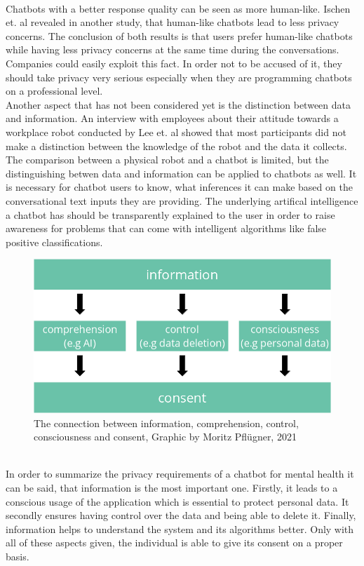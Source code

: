 \documentclass[sigconf, nonacm]{acmart}
\begin{document}
\\
Chatbots with a better response quality can be seen as more human-like. Ischen et. al revealed in another study, that human-like chatbots lead to less privacy concerns\cite{Ischen}.
The conclusion of both results is that users prefer human-like chatbots while having less privacy concerns at the same time during the conversations. Companies could easily exploit this fact. In order not to be accused of it, they should take privacy very serious especially when they are programming chatbots on a professional level.  
\\
Another aspect that has not been considered yet is the distinction between data and information. An interview with employees about their attitude towards a workplace robot conducted by Lee et. al showed that most participants did not make a distinction between the knowledge of the robot and the data it collects.\cite{Lee2011}
\\
The comparison between a physical robot and a chatbot is limited, but the distinguishing betwen data and information can be applied to chatbots as well. It is necessary for chatbot users to know, what inferences it can make based on the conversational text inputs they are providing. The underlying artifical intelligence a chatbot has should be transparently explained 
to the user in order to raise awareness for problems that can come with intelligent algorithms like false positive classifications.
\begin{figure}[h]
  \centering
  \includegraphics[width=\linewidth]{privacy_base}
  \caption{The connection between information, comprehension, control, consciousness and consent, Graphic by Moritz Pflügner, 2021}
\end{figure}
\\
In order to summarize the privacy requirements of a chatbot for mental health it can be said, that information is the most important one. Firstly, it leads to a conscious usage of the application which is essential to protect personal data. It secondly ensures having control over the data and being able to delete it. Finally, information helps to understand the system and 
its algorithms better. Only with all of these aspects given, the individual is able to give its consent on a proper basis. 
\end{document}
